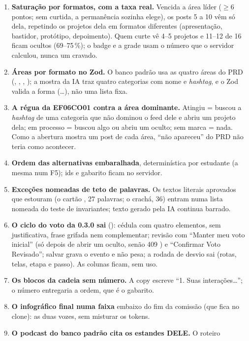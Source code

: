 \begin{enumerate}
  \item \textbf{Saturação por formatos, com a taxa real.} Vencida a área líder
    (\(\geq 6\) pontos; sem curtida, a permanência sozinha elege), os posts
    5 a 10 vêm só dela, repetindo os projetos dela em formatos diferentes
    (apresentação, bastidor, protótipo, depoimento). Quem curte vê 4--5
    projetos e 11--12 de 16 ficam ocultos (69--75\,\%); o badge e a grade usam
    o número que o servidor calculou, nunca um cravado.
  \item \textbf{Áreas por formato no Zod.} O banco padrão usa as quatro áreas
    do PRD (, , ,
    ); a mostra da IA traz quatro categorias com nome e
    \emph{hashtag}, e o Zod valida a forma (\ldots{}),
    não uma lista fixa.
  \item \textbf{A régua da EF06CO01 contra a área dominante.} Atingiu = buscou
    a \emph{hashtag} de uma categoria que não dominou o feed dele e abriu um
    projeto dela; em processo = buscou algo ou abriu um oculto; sem marca =
    nada. Como a abertura mostra um post de cada área, \enquote{não apareceu}
    do PRD não teria como acontecer.
  \item \textbf{Ordem das alternativas embaralhada}, determinística por
    estudante (a mesma num F5); ids e gabarito ficam no servidor.
  \item \textbf{Exceções nomeadas de teto de palavras.} Os textos literais
    aprovados que estouram (o cartão , 27 palavras; o crachá, 36)
    entram numa lista nomeada do teste de invariantes; texto gerado pela IA
    continua barrado.
  \item \textbf{O ciclo do voto da 0.3.0 sai} (): cédula com
    quatro elementos, sem justificativa, frase grifada nem complementar;
    revisão com \enquote{Manter meu voto inicial} (só depois de abrir um
    oculto, senão 409 ) e \enquote{Confirmar Voto
    Revisado}; salvar grava o evento e não pesa; a rodada de desvio sai
    (rotas, telas, etapa e passo). As colunas ficam, sem uso.
  \item \textbf{Os blocos da cadeia sem número.} A copy escreve \enquote{1.
    Suas interações\ldots}; o número entregaria a ordem, que é o gabarito.
  \item \textbf{O infográfico final numa faixa } embaixo do fim
    da comissão (que fica no clone): as duas vozes, sem misturar os tokens.
  \item \textbf{O podcast do banco padrão cita os estandes DELE.} O roteiro

\end{enumerate}
